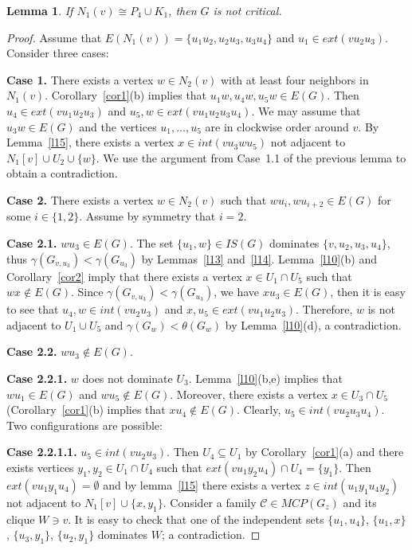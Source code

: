 \documentclass[12pt]{article}
\newtheorem{lemma}{Lemma}
\begin{document}
\begin{lemma}\label{l40}
If $N_1(v) \cong P_4 \cup K_1$, then $G$ is not critical.
\end{lemma}

\begin{proof}

Assume that $E(N_1(v)) = \{u_1u_2,u_2u_3,u_3u_4\}$ and $u_1 \in ext(vu_2u_3)$. Consider three cases:

\textbf{Case 1.} There exists a vertex $w \in N_2(v)$ with at least four neighbors in $N_1(v)$. Corollary~\ref{cor1}(b) implies that $u_1w,u_4w,u_5w \in E(G)$. Then $u_4 \in ext(vu_1u_2u_3)$ and $u_5,w \in ext(vu_1u_2u_3u_4)$. We may assume that $u_3w \in E(G)$ and the vertices $u_1,\ldots,u_5$ are in clockwise order around $v$. By Lemma~\ref{l15}, there exists a vertex $x \in int(vu_3wu_5)$ not adjacent to $N_1[v] \cup U_2 \cup \{w\}$. We use the argument from Case~1.1 of the previous lemma to obtain a contradiction.

\textbf{Case 2.} There exists a vertex $w \in N_2(v)$ such that $wu_i, wu_{i+2} \in E(G)$ for some $i \in \{1,2\}$. Assume by symmetry that $i = 2$.

\textbf{Case 2.1.} $wu_3 \in E(G)$. The set $\{u_1,w\} \in IS(G)$ dominates $\{v,u_2,u_3,u_4\}$, thus $\gamma(G_{v,u_3}) < \gamma(G_{u_3})$ by Lemmas~\ref{l13} and~\ref{l14}. Lemma~\ref{l10}(b) and Corollary~\ref{cor2} imply that there exists a vertex $x \in U_1 \cap U_5$ such that $wx \notin E(G)$. Since $\gamma(G_{v,u_3}) < \gamma(G_{u_3})$, we have $xu_3 \in E(G)$, then it is easy to see that $u_4,w \in int(vu_2u_3)$ and $x,u_5 \in ext(vu_1u_2u_3)$.  Therefore, $w$ is not adjacent to $U_1 \cup U_5$ and $\gamma(G_w) < \theta(G_w)$ by Lemma~\ref{l10}(d), a contradiction.

\textbf{Case 2.2.} $wu_3 \notin E(G)$. 

\textbf{Case 2.2.1.} $w$ does not dominate $U_3$. Lemma~\ref{l10}(b,e) implies that $wu_1 \in E(G)$ and $wu_5 \notin E(G)$. Moreover, there exists a vertex $x \in U_3 \cap U_5$ (Corollary~\ref{cor1}(b) implies that $xu_4 \notin E(G)$. Clearly, $u_5 \in int(vu_2u_3u_4)$. Two configurations are possible:

\textbf{Case 2.2.1.1.} $u_5 \in int(vu_2u_3)$. Then $U_4 \subseteq U_1$ by Corollary~\ref{cor1}(a) and there exists vertices $y_1,y_2 \in U_1 \cap U_4$ such that $ext(vu_1y_2u_4) \cap U_4 = \{y_1\}$. Then $ext(vu_1y_1u_4) = \emptyset$ and by lemma~\ref{l15} there exists a vertex $z \in int(u_1y_1u_4y_2)$ not adjacent to $N_1[v] \cup \{x,y_1\}$. Consider a family $\mathcal{C} \in MCP(G_z)$ and its clique $W \ni v$. It is easy to check that one of the independent sets $\{u_1,u_4\}$, $\{u_1,x\}$, $\{u_3,y_1\}$, $\{u_2,y_1\}$ dominates $W$; a contradiction.


\end{proof}
\end{document}
